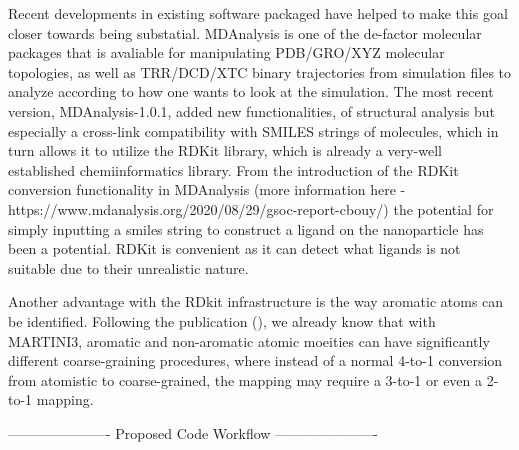 Recent developments in existing software packaged have helped to make this goal closer towards being substatial. MDAnalysis is one of the de-factor molecular packages that
is avaliable for manipulating PDB/GRO/XYZ molecular topologies, as well as TRR/DCD/XTC binary trajectories from simulation files to analyze according to how one wants to look at the simulation. 
The most recent version, MDAnalysis-1.0.1, added new functionalities, of structural analysis but especially a cross-link compatibility with SMILES strings of molecules, which in turn
allows it to utilize the RDKit library, which is already a very-well established chemiinformatics library. From the introduction of the RDKit conversion functionality in MDAnalysis (more information here - https://www.mdanalysis.org/2020/08/29/gsoc-report-cbouy/) the potential for simply inputting a smiles string to construct a ligand on the nanoparticle has been a potential. RDKit is convenient as it can detect what ligands is not suitable due to
their unrealistic nature.

Another advantage with the RDkit infrastructure is the way aromatic atoms can be identified. Following the publication (), we already know that with MARTINI3, aromatic and non-aromatic
atomic moeities can have significantly different coarse-graining procedures, where instead of a normal 4-to-1 conversion from atomistic to coarse-grained, the mapping may require a 3-to-1 or even
a 2-to-1 mapping.




----------------------
Proposed Code Workflow
----------------------


